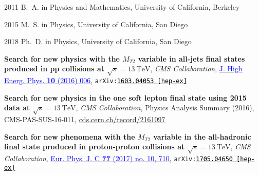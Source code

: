 \begin{frontmatter}
\begin{acknowledgements}
\end{acknowledgements}                                                         

\begin{vitapage}                                                               
\begin{vita}                                                                   
  \item[2011] B.~A. in Physics and Mathematics, University of California, Berkeley                                                    
  \item[2015] M.~S. in Physics, University of California, San Diego                                                    
  \item[2018] Ph.~D. in Physics, University of California, San Diego    
\end{vita}                                                                     
\begin{publications}                                                           
\item \textbf{Search for new physics with the $M_{T2}$ variable in all-jets final states produced in pp collisions at $\sqrt{s}=13~\mathrm{TeV}$}, {\it CMS Collaboration},  \href{http://dx.doi.org/10.1007/JHEP10(2016)006}{\textcolor{blue}{J. High Energ. Phys. \textbf{10} (2016) 006}}, {\tt arXiv:\href{http://arxiv.org/abs/1603.04053}{\textcolor{black}{1603.04053 [hep-ex]}}}
\item \textbf{Search for new physics in the one soft lepton final state using 2015 data at $\sqrt{s}=13~\mathrm{TeV}$}, {\it CMS Collaboration}, Physics Analysis Summary (2016), CMS-PAS-SUS-16-011, \textcolor{black}{\href{https://cds.cern.ch/record/2161097}{cds.cern.ch/record/2161097}}
\item \textbf{Search for new phenomena with the $M_{T2}$ variable in the all-hadronic final state produced in proton-proton collisions at $\sqrt{s}=13~\mathrm{TeV}$}, {\it CMS Collaboration}, \href{http://dx.doi.org/10.1140/epjc/s10052-017-5267-x}{\textcolor{blue}{Eur. Phys. J. C {\bf77} (2017) no. 10, 710}}, {\tt arXiv:\href{http://arxiv.org/abs/1705.04650}{\textcolor{black}{1705.04650 [hep-ex]}}}

\end{publications}                                                             
\end{vitapage}                                                                 
                                                                               


\end{frontmatter}
